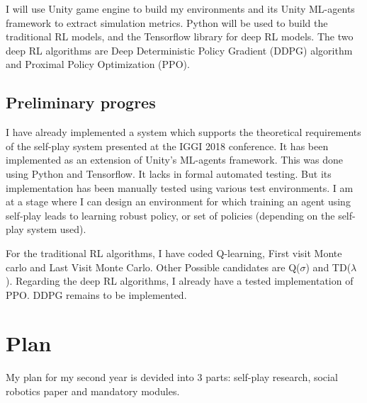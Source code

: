 \documentclass{article}
\begin{document}
I will use Unity game engine to build my environments and its Unity ML-agents framework to extract simulation metrics. Python will be used to build the traditional RL models, and the Tensorflow library for deep RL models. The two deep RL algorithms are Deep Deterministic Policy Gradient (DDPG) algorithm and Proximal Policy Optimization (PPO). 


\subsection{Preliminary progres}

I have already implemented a system which supports the theoretical requirements of the self-play system presented at the IGGI 2018 conference. It has been implemented as an extension of Unity's ML-agents framework. This was done using Python and Tensorflow. It lacks in formal automated testing. But its implementation has been manually tested using various test environments. I am at a stage where I can design an environment for which training an agent using self-play leads to learning robust policy, or set of policies (depending on the self-play system used).

For the traditional RL algorithms, I have coded Q-learning, First visit Monte carlo and Last Visit Monte Carlo. Other Possible candidates are Q($\sigma$) and TD($\lambda$). Regarding the deep RL algorithms, I already have a tested implementation of PPO\@. DDPG remains to be implemented.

\section{Plan}
My plan for my second year is devided into 3 parts: self-play research, social robotics paper and mandatory modules.
\end{document}
